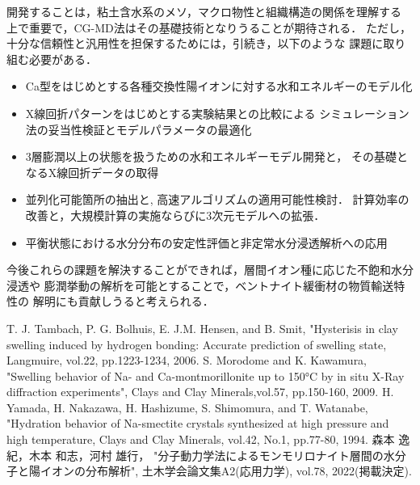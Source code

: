 ﻿\documentclass[11pt,a4j]{jarticle}
\begin{document}
開発することは，粘土含水系のメソ，マクロ物性と組織構造の関係を理解する
上で重要で，CG-MD法はその基礎技術となりうることが期待される．
ただし，十分な信頼性と汎用性を担保するためには，引続き，以下のような
課題に取り組む必要がある．
\begin{itemize}
\item
	Ca型をはじめとする各種交換性陽イオンに対する水和エネルギーのモデル化
\item
	X線回折パターンをはじめとする実験結果との比較による
	シミュレーション法の妥当性検証とモデルパラメータの最適化
\item
    	3層膨潤以上の状態を扱うための水和エネルギーモデル開発と，
	その基礎となるX線回折データの取得
\item
	並列化可能箇所の抽出と, 高速アルゴリズムの適用可能性検討．
	計算効率の改善と，大規模計算の実施ならびに3次元モデルへの拡張．
\item
	平衡状態における水分分布の安定性評価と非定常水分浸透解析への応用
\end{itemize}
今後これらの課題を解決することができれば，層間イオン種に応じた不飽和水分浸透や
膨潤挙動の解析を可能とすることで，ベントナイト緩衝材の物質輸送特性の
解明にも貢献しうると考えられる．
\begin{thebibliography}{99}
	T. J. Tambach, P. G. Bolhuis, E. J.M. Hensen, and B. Smit, 
	"Hysterisis in clay swelling induced by hydrogen bonding: 
		Accurate prediction of swelling state, Langmuire, 
	vol.22, pp.1223-1234, 2006.
	S. Morodome and K. Kawamura, 
	"Swelling behavior of Na- and Ca-montmorillonite up to 150°C by 
	in situ X-Ray diffraction experiments", 
	Clays and Clay Minerals,vol.57, pp.150-160, 2009.
	H. Yamada, H. Nakazawa, H. Hashizume, S. Shimomura, and T. Watanabe, 
	"Hydration behavior of Na-smectite crystals synthesized at high pressure 
	and high temperature, Clays and Clay Minerals, vol.42, No.1, pp.77-80, 1994.
	森本 逸紀，木本 和志，河村 雄行，
	"分子動力学法によるモンモリロナイト層間の水分子と陽イオンの分布解析", 
		土木学会論文集A2(応用力学), vol.78, 2022(掲載決定). 	
\end{thebibliography}
\end{document}
